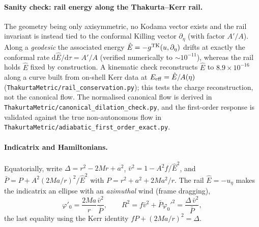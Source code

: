 \documentclass[12pt]{iopart}
\theoremstyle{plain}
\theoremstyle{definition}
\theoremstyle{remark}
\newcommand{\Ehat}{\hat E}
\newcommand{\dd}{\mathrm{d}}
\begin{document}
\paragraph{Sanity check: rail energy along the Thakurta--Kerr rail.} The geometry being
only axisymmetric, no Kodama vector exists and the rail invariant is instead tied to the
conformal Killing vector $\partial_\eta$ (with factor $A'/A$). Along a \emph{geodesic} the
associated energy $\Ehat=-g^{\rm TK}(u,\partial_\eta)$ drifts at exactly the conformal
rate $\dd\Ehat/\dd\tau=A'/A$ (verified numerically to $\sim\!10^{-11}$), whereas the
rail holds $\Ehat$ fixed by construction. A kinematic check reconstructs $\Ehat$ to
$8.9\times10^{-16}$ along a curve built from on-shell Kerr data at
$E_{\rm eff}=\Ehat/A(\eta)$ (\texttt{ThakurtaMetric/rail\_conservation.py}); this tests the
charge reconstruction, not the canonical flow. The normalised canonical flow is derived
in \texttt{ThakurtaMetric/canonical\_dilation\_check.py}, and the first-order response is
validated against the true non-autonomous flow in
\texttt{ThakurtaMetric/adiabatic\_first\_order\_exact.py}.

\paragraph{Indicatrix and Hamiltonians.} Equatorially, write
$\Delta=r^2-2Mr+a^2$, $\bar v^2=1-A^2f/\Ehat^2$, and
$\bar P=P+A^2(2Ma/r)^2/\Ehat^2$ with $P=r^2+a^2+2Ma^2/r$. The rail
$\Ehat=-u_\eta$ makes the indicatrix an ellipse with an \emph{azimuthal} wind
(frame dragging),
\begin{equation}
    \varphi'_0=\frac{2Ma}{r}\frac{\bar v^2}{\bar P},\qquad
    R^2=f\bar v^2+\bar P\varphi_0'^2=\frac{\Delta\,\bar v^2}{\bar P},
    \label{eq:tk-ind}
\end{equation}
the last equality using the Kerr identity $fP+(2Ma/r)^2=\Delta$.
\end{document}
